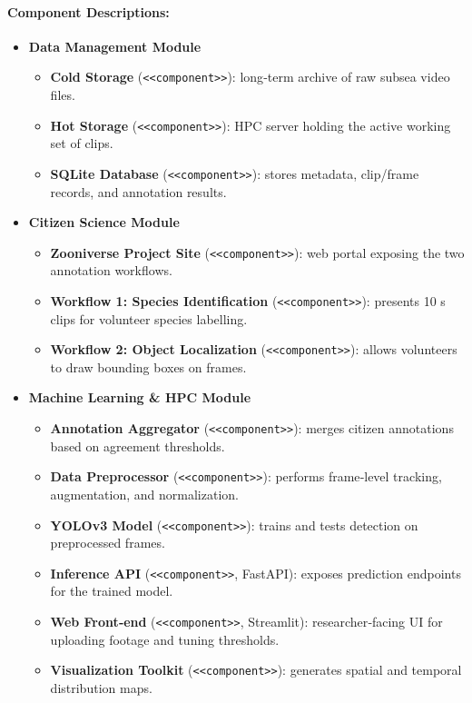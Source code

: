 \paragraph{Component Descriptions:}
\begin{itemize}
  \item \textbf{Data Management Module}
    \begin{itemize}
      \item \textbf{Cold Storage} (\verb|<<component>>|): long‐term archive of raw subsea video files.
      \item \textbf{Hot Storage} (\verb|<<component>>|): HPC server holding the active working set of clips.
      \item \textbf{SQLite Database} (\verb|<<component>>|): stores metadata, clip/frame records, and annotation results.
    \end{itemize}

  \item \textbf{Citizen Science Module}
    \begin{itemize}
      \item \textbf{Zooniverse Project Site} (\verb|<<component>>|): web portal exposing the two annotation workflows.
      \item \textbf{Workflow 1: Species Identification} (\verb|<<component>>|): presents 10 s clips for volunteer species labelling.
      \item \textbf{Workflow 2: Object Localization} (\verb|<<component>>|): allows volunteers to draw bounding boxes on frames.
    \end{itemize}

  \item \textbf{Machine Learning \& HPC Module}
    \begin{itemize}
      \item \textbf{Annotation Aggregator} (\verb|<<component>>|): merges citizen annotations based on agreement thresholds.
      \item \textbf{Data Preprocessor} (\verb|<<component>>|): performs frame‐level tracking, augmentation, and normalization.
      \item \textbf{YOLOv3 Model} (\verb|<<component>>|): trains and tests detection on preprocessed frames.
      \item \textbf{Inference API} (\verb|<<component>>|, FastAPI): exposes prediction endpoints for the trained model.
      \item \textbf{Web Front‐end} (\verb|<<component>>|, Streamlit): researcher‐facing UI for uploading footage and tuning thresholds.
      \item \textbf{Visualization Toolkit} (\verb|<<component>>|): generates spatial and temporal distribution maps.
    \end{itemize}
\end{itemize}

